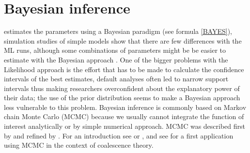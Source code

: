 %
%
\section{Bayesian inference}
\migrate estimates the parameters using a Bayesian paradigm (see formula \ref{BAYES}), simulation studies of simple models show that there are few differences with the ML runs, although some combinations of parameters might be be easier to estimate with the Bayesian approach \citep{beerli:2006:CBM}. One of the bigger problems with the Likelihood approach is the effort that has to be made to calculate the confidence intervals of the best estimates, default analyses often led to narrow support intervals thus making researchers overconfident about the explanatory power of their data; the use of the prior distribution seems to make a Bayesian approach less vulnerable to this problem. Bayesian inference is commonly based on Markov chain Monte Carlo (MCMC) because we usually cannot integrate the function of interest analytically or by simple numerical approach. MCMC was described first by \cite{Metropolis:1953:ESC} and refined by \cite{hastings1970-97}. For an introduction see \cite{Hammersley:1964:MCM}or \cite{chib:1995:umh}, 
and see \cite{kuhner1995-1421} for a first application using MCMC in the context of coalescence theory.


